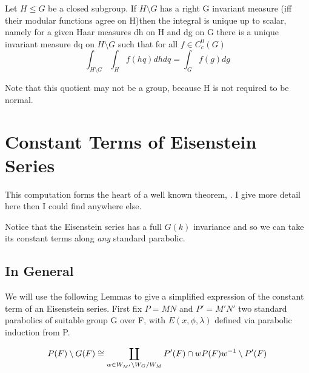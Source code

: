 \begin{Theorem}
        Let \(H\leq G\) be a closed subgroup. If \(H\setminus G\) has a right G invariant measure (iff their modular functions agree on H)then the integral is unique up to scalar, namely for a given Haar measures dh on H and dg on G there is a unique invariant measure dq on \(H\setminus G\) such that for all \(f\in C_c^0(G)\)
        \[\int_{H\setminus G}\int_H f(hq)dhdq = \int_G f(g) dg\]
    \end{Theorem}
    Note that this quotient may not be a group, because H is not required to be normal.

\section{Constant Terms of Eisenstein Series}
This computation forms the heart of a well known theorem, \cite[Prop 10.4.2]{getzIntroductionAutomorphicRepresentations2024}\cite[II.1.7]{moeglinSpectralDecompositionEisenstein1995}\cite[6.2]{shahidiEisensteinSeriesAutomorphic2010}. I give more detail here then I could find anywhere else. 

Notice that the Eisenstein series has a full \(G(k)\) invariance and so we can take its constant terms along \textit{any} standard parabolic.

\subsection{In General}
We will use the following Lemmas to give a simplified expression of the constant term of an Eisenstein series. First fix \(P = MN\) and \(P' = M'N'\) two standard parabolics of suitable group G over F, with \(E(x, \phi, \lambda)\) defined via  parabolic induction from P.

    \begin{Lemma}\label{lem:1}
        \[P(F)\setminus G(F) \cong \coprod_{w\in W_{M'}\setminus W_G / W_{M}} P'(F)\cap wP(F)w^{-1} \setminus P'(F)\]
    \end{Lemma}

